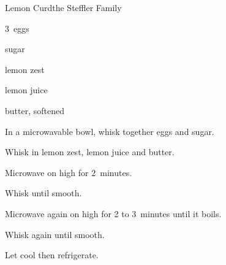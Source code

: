 \begin{recipe}{Lemon Curd}{the Steffler Family}{}

\begin{ingredients}
\item 3~eggs
\item \C{\threequarter} sugar
\item {} lemon zest
\item \C{\half} lemon juice
\item {} butter, softened
\end{ingredients}

\begin{directions}
\item In a microwavable bowl, whisk together eggs and sugar.
\item Whisk in lemon zest, lemon juice and butter.
\item Microwave on high for 2~minutes.
\item Whisk until smooth.
\item Microwave again on high for 2 to 3~minutes until it boils.
\item Whisk again until smooth.
\item Let cool then refrigerate.
\end{directions}

\end{recipe}
